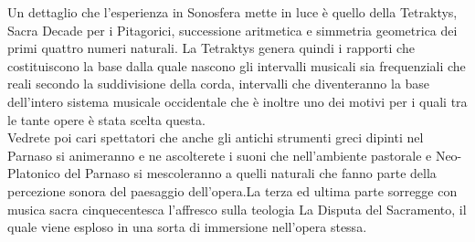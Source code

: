 \documentclass[hidelinks,12pt,a4paper]{article}
\begin{document}
\begin{flushleft}
			Un dettaglio che l'esperienza in Sonosfera mette in luce è quello della Tetraktys, Sacra Decade per i Pitagorici, successione aritmetica e simmetria geometrica dei primi quattro numeri naturali. La Tetraktys genera quindi i rapporti che costituiscono la base dalla quale nascono gli intervalli musicali sia frequenziali che reali secondo la suddivisione della corda, intervalli che diventeranno la base dell'intero sistema musicale occidentale che è inoltre uno dei motivi per i quali tra le tante opere è stata scelta questa.\\
			Vedrete poi cari spettatori che anche gli antichi strumenti greci dipinti nel Parnaso si animeranno e ne ascolterete i suoni che nell'ambiente pastorale e Neo-Platonico del Parnaso si mescoleranno a quelli naturali che fanno parte della percezione sonora del paesaggio dell'opera.La terza ed ultima parte sorregge con musica sacra cinquecentesca l'affresco sulla teologia La Disputa del Sacramento, il quale viene esploso in una sorta di immersione nell'opera stessa.
	
			\vspace*{\fill}
			\doclicenseThis
		\end{flushleft}
\end{document}
